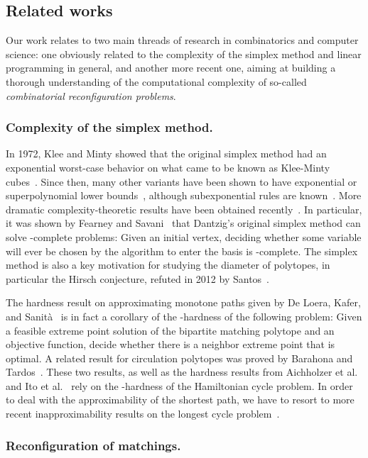 \documentclass[runningheads]{llncs}
\begin{document}
\subsection{Related works}

Our work relates to two main threads of research in combinatorics and computer science: one obviously related to the complexity of the simplex method and linear programming in general, and another more recent one, aiming at building a thorough understanding of the computational complexity of so-called \emph{combinatorial reconfiguration problems}.

\subsubsection*{Complexity of the simplex method.}

In 1972, Klee and Minty showed that the original simplex method had an exponential worst-case behavior on what came to be known as {Klee-Minty cubes}~\cite{KM72}.
Since then, many other variants have been shown to have exponential or superpolynomial lower bounds~\cite{J73a,B77,GS79,AF17,DFH19}, although subexponential rules are known~\cite{HZ15}.
More dramatic complexity-theoretic results have been obtained recently~\cite{APR14,DS19}. In particular, it was shown by Fearney and Savani~\cite{FS15} that Dantzig's original simplex method can solve \PSPACE-complete problems: Given an initial vertex, deciding whether some variable will ever be chosen by the algorithm to enter the basis is \PSPACE-complete. The simplex method is also a key motivation for studying the diameter of polytopes, in particular the Hirsch conjecture, refuted in 2012 by Santos~\cite{S12}.

The hardness result on approximating monotone paths given by De Loera, Kafer, and Sanit\`a~\cite{DKS22} is in fact a corollary of the \NP-hardness of the following problem:
Given a feasible extreme point solution of the bipartite matching polytope and an objective function, decide whether there is a neighbor extreme point that is optimal.
A related result for circulation polytopes was proved by Barahona and Tardos~\cite{BT89}.
These two results, as well as the hardness results from Aichholzer et al.~\cite{ACHKMS21} and Ito et al.~\cite{IKKKO22} rely on the \NP-hardness of the Hamiltonian cycle problem.
In order to deal with the approximability of the shortest path, we have to resort to more recent inapproximability results on the longest cycle problem~\cite{BHK04}.

\subsubsection*{Reconfiguration of matchings.}
\end{document}
